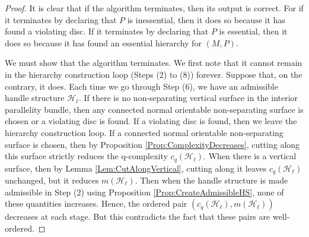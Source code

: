 \documentclass[oneside]{amsart}
\numberwithin{equation}{section}
\theoremstyle{plain}
\theoremstyle{definition}
\begin{document}
\begin{proof}
It is clear that if the algorithm terminates, then its output is correct. For if it terminates by declaring that $P$ is inessential, then it does so because it has found a violating disc. If it terminates by declaring that $P$ is essential, then it does so because it has found an essential hierarchy for $(M, P)$.

We must show that the algorithm terminates. We first note that it cannot remain in the hierarchy construction loop (Steps (2) to (8)) forever. Suppose that, on the contrary, it does. Each time we go through Step (6), we have an admissible handle structure $\mathcal{H}_\ell$. If there is no non-separating vertical surface in the interior parallelity bundle, then any connected normal orientable non-separating surface is chosen or a violating disc is found. If a violating disc is found, then we leave the hierarchy construction loop. If a connected normal orientable non-separating surface is chosen, then
by Proposition \ref{Prop:ComplexityDecreases}, cutting along this surface strictly reduces the q-complexity $c_q(\mathcal{H}_\ell)$. When there is a vertical surface, then by Lemma \ref{Lem:CutAlongVertical}, cutting along it leaves $c_q(\mathcal{H}_\ell)$ unchanged, but it reduces $m(\mathcal{H}_\ell)$. Then when the handle structure is made admissible in Step (2) using Proposition \ref{Prop:CreateAdmissibleHS}, none of these quantities increases. Hence, the ordered pair $(c_q(\mathcal{H}_\ell), m(\mathcal{H}_\ell))$ decreases at each stage. But this contradicts the fact that these pairs are well-ordered.


\end{proof}
\end{document}
